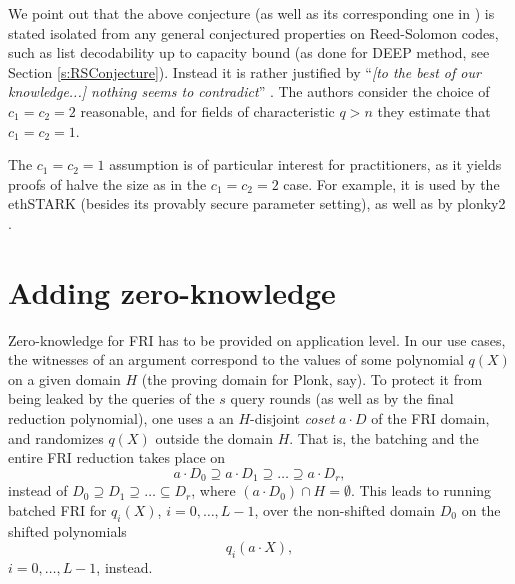 \documentclass[11pt,article,oneside]{memoir}
\theoremstyle{definition}
\theoremstyle{remark}
\begin{document}
We point out that the above conjecture (as well as its corresponding one in \cite{FRI}) is stated isolated from any general conjectured properties on Reed-Solomon codes, such as list decodability up to capacity bound (as done for DEEP method, see Section \ref{s:RSConjecture}). 
Instead it is rather justified by “\textit{[to the best of our knowledge...] nothing seems to contradict}” .
The authors consider the choice of $c_1=c_2=2$ reasonable, and for fields of characteristic $q>n$ they estimate that $c_1=c_2=1$. 

The $c_1=c_2=1$ assumption is of particular interest for practitioners, as it yields proofs of halve the size as in the $c_1=c_2=2$ case. For example, it is used by the ethSTARK \cite{ethSTARK} (besides its provably secure parameter setting), as well as by plonky2 \cite{PolygonZero}.


\section{Adding zero-knowledge}

Zero-knowledge for FRI has to be provided on application level. 
In our use cases, the witnesses of an argument correspond to the values of some polynomial $q(X)$ on a given domain $H$ (the proving domain for Plonk, say). 
To protect it from being leaked by the queries of the $s$ query rounds (as well as by the final reduction polynomial), one uses a an $H$-disjoint \textit{coset} $a\cdot D$ of the FRI domain, and randomizes $q(X)$ outside the domain $H$. 
That is, the batching and the entire FRI reduction takes place on 
\[
a\cdot D_0\supseteq a\cdot D_1 \supseteq \ldots \supseteq a\cdot D_{r}, 
\]
instead of $D_0\supseteq D_1 \supseteq \ldots \subseteq D_r$, where $(a\cdot D_0) \cap H=\emptyset$.
This leads to running batched FRI for $q_i(X)$, $i=0,\ldots, L-1$, over the non-shifted domain $D_0$ on the shifted polynomials
\[
q_i(a\cdot X), 
\]
$i=0,\ldots,L-1$, instead.
\end{document}
